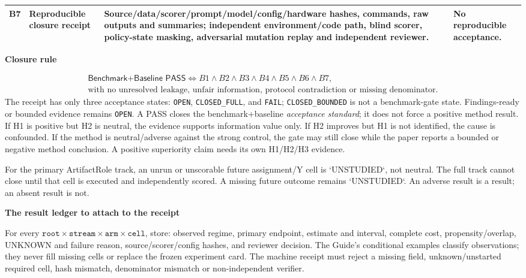 \documentclass[10pt,a4paper]{article}
\newcommand{\lead}[1]{\vspace{4pt}\textbf{#1}\par}
\begin{document}
\begin{center}
\begin{tabularx}{\linewidth}{@{}lL{.22\linewidth}X L{.21\linewidth}@{}}
B7 & Reproducible closure receipt & Source/data/scorer/prompt/model/config/hardware hashes, commands, raw outputs and summaries; independent environment/code path, blind scorer, policy-state masking, adversarial mutation replay and independent reviewer. & No reproducible acceptance.\\\bottomrule
\end{tabularx}\end{center}\normalsize

\lead{Closure rule}
\[
\begin{gathered}
\textsf{Benchmark+Baseline PASS}
\iff B1\land B2\land B3\land B4\land B5\land B6\land B7,\\
\text{with no unresolved leakage, unfair information, protocol contradiction or missing denominator.}
\end{gathered}
\]
The receipt has only three acceptance states: \texttt{OPEN}, \texttt{CLOSED\_FULL}, and \texttt{FAIL};
\texttt{CLOSED\_BOUNDED} is not a benchmark-gate state. Findings-ready or bounded evidence
remains \texttt{OPEN}. A PASS closes the benchmark+baseline \emph{acceptance standard}; it does not
force a positive method result. If H1 is positive but H2 is neutral, the evidence
supports information value only. If H2 improves but H1 is not identified, the
cause is confounded. If the method is neutral/adverse against the strong control,
the gate may still close while the paper reports a bounded or negative method
conclusion. A positive superiority claim needs its own H1/H2/H3 evidence.

For the primary ArtifactRole track, an unrun or unscorable future assignment/Y
cell is `UNSTUDIED`, not neutral. The full track cannot close until that cell is
executed and independently scored. A missing future outcome remains `UNSTUDIED`.
An adverse result is a result; an absent result is not.

\lead{The result ledger to attach to the receipt}
For every $\texttt{root}\times\texttt{stream}\times\texttt{arm}\times\texttt{cell}$, store: observed regime,
primary endpoint, estimate and interval, complete cost, propensity/overlap,
UNKNOWN and failure reason, source/scorer/config hashes, and reviewer decision.
The Guide's conditional examples classify observations; they never fill missing
cells or replace the frozen experiment card. The machine receipt must reject a
missing field, unknown/unstarted required cell, hash mismatch, denominator mismatch
or non-independent verifier.\normalsize
\end{document}
